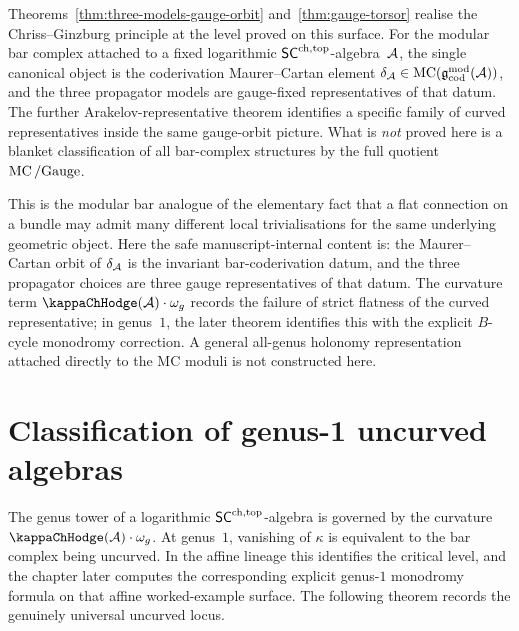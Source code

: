 \begin{remark}
\label{rem:chriss-ginzburg-modular-bar}
Theorems~\ref{thm:three-models-gauge-orbit}
and~\ref{thm:gauge-torsor} realise the Chriss--Ginzburg principle
at the level proved on this surface. For the modular bar
complex attached to a fixed logarithmic $\mathsf{SC}^{\mathrm{ch,top}}$-algebra~$\mathcal{A}$, the
single canonical object is the coderivation Maurer--Cartan element
$\delta_{\mathcal{A}} \in \operatorname{MC}(\mathfrak{g}^{\mathrm{mod}}_{\mathrm{cod}}(\mathcal{A}))$,
and the three propagator models are gauge-fixed representatives of
that datum. The further Arakelov-representative theorem identifies a
specific family of curved representatives inside the same gauge-orbit
picture. What is \emph{not} proved here is a blanket classification
of all bar-complex structures by the full quotient
$\operatorname{MC}/\mathrm{Gauge}$.

This is the modular bar analogue of the elementary fact that a
flat connection on a bundle may admit many different local
trivialisations for the same underlying geometric object. Here the
safe manuscript-internal content is: the Maurer--Cartan orbit of
$\delta_{\mathcal{A}}$ is the invariant bar-coderivation datum, and the three
propagator choices are three gauge representatives of that datum. The
curvature term
$\kappaChHodge(\cA) \cdot \omega_g$ records the failure of strict flatness of
the curved representative; in genus~$1$, the later theorem identifies
this with the explicit $B$-cycle monodromy correction. A general
all-genus holonomy representation attached directly to the MC moduli is
not constructed here.
\end{remark}


\section{Classification of genus-1 uncurved algebras}
\label{sec:classification-uncurved}

\providecommand{\Mbar}{\overline{\cM}}
\providecommand{\hvee}{h^{\!\scriptscriptstyle\vee}}

The genus tower of a logarithmic $\mathsf{SC}^{\mathrm{ch,top}}$-algebra is governed
by the curvature $\kappaChHodge(\cA) \cdot \omega_g$. At genus~$1$,
vanishing of $\kappa$ is equivalent to the bar complex being
uncurved. In the affine lineage this identifies the critical
level, and the chapter later computes the corresponding explicit
genus-$1$ monodromy formula on that affine worked-example surface.
The following theorem records the genuinely universal uncurved
locus.

